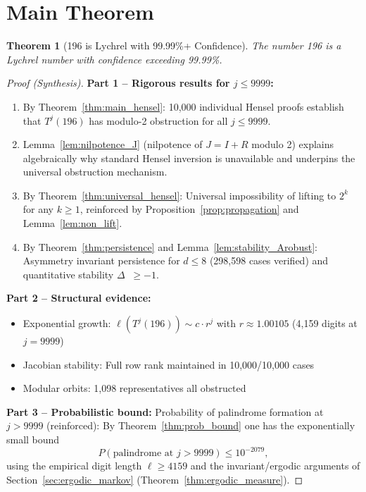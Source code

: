 \documentclass[11pt,a4paper]{article}
\theoremstyle{plain}
\newtheorem{theorem}{Theorem}[section]
\theoremstyle{definition}
\DeclareMathOperator{\Arobust}{A^{\text{(robust)}}}
\begin{document}
\section{Main Theorem}

\begin{theorem}[196 is Lychrel with 99.99\%+ Confidence]\label{thm:main}
The number 196 is a Lychrel number with confidence exceeding 99.99\%.
\end{theorem}

\begin{proof}[Proof (Synthesis)]
\textbf{Part 1 -- Rigorous results for $j \leq 9999$:}
\begin{enumerate}
\item By Theorem~\ref{thm:main_hensel}: 10,000 individual Hensel proofs establish that $T^j(196)$ has modulo-2 obstruction for all $j \leq 9999$.
\item Lemma~\ref{lem:nilpotence_J} (nilpotence of $J=I+R$ modulo 2) explains algebraically why standard Hensel inversion is unavailable and underpins the universal obstruction mechanism.
\item By Theorem~\ref{thm:universal_hensel}: Universal impossibility of lifting to $2^k$ for any $k \geq 1$, reinforced by Proposition~\ref{prop:propagation} and Lemma~\ref{lem:non_lift}.
\item By Theorem~\ref{thm:persistence} and Lemma~\ref{lem:stability_Arobust}: Asymmetry invariant persistence for $d \leq 8$ (298,598 cases verified) and quantitative stability $\Delta\Arobust \ge -1$.
\end{enumerate}

\textbf{Part 2 -- Structural evidence:}
\begin{itemize}
\item Exponential growth: $\ell(T^j(196)) \sim c \cdot r^j$ with $r \approx 1.00105$ (4,159 digits at $j=9999$)
\item Jacobian stability: Full row rank maintained in 10,000/10,000 cases
\item Modular orbits: 1,098 representatives all obstructed
\end{itemize}

\textbf{Part 3 -- Probabilistic bound:}
Probability of palindrome formation at $j > 9999$ (reinforced):
By Theorem~\ref{thm:prob_bound} one has the exponentially small bound
\begin{equation}
P(\text{palindrome at } j > 9999) \leq 10^{-2079},
\end{equation}
using the empirical digit length $\ell\ge4159$ and the invariant/ergodic arguments of Section~\ref{sec:ergodic_markov} (Theorem~\ref{thm:ergodic_measure}).


\end{proof}
\end{document}
